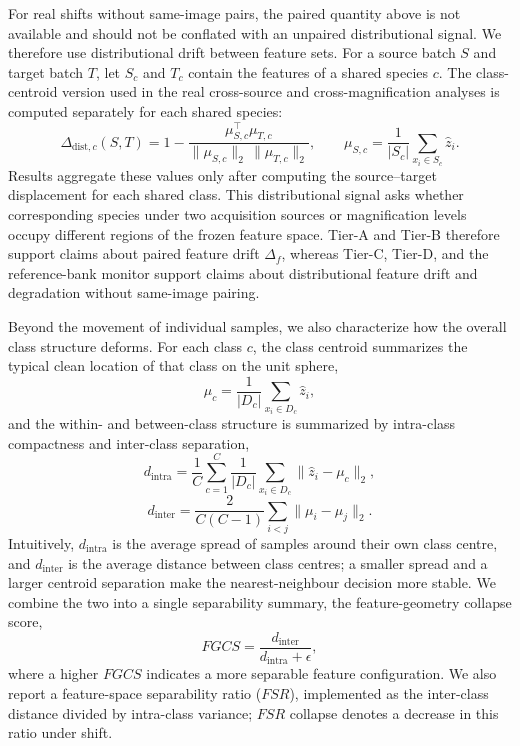 \documentclass[a4paper,fleqn]{els-cas-templates/cas-sc}
\begin{document}
For real shifts without same-image pairs, the paired quantity above is not
available and should not be conflated with an unpaired distributional signal. We therefore
use distributional drift between feature sets. For a source batch $S$ and target
batch $T$, let $S_c$ and $T_c$ contain the features of a shared species $c$.
The class-centroid version used in the real cross-source and
cross-magnification analyses is computed separately for each shared species:
\begin{equation}
  \Delta_{\mathrm{dist},c}(S,T)
  =1-\frac{\mu_{S,c}^\top \mu_{T,c}}
  {\|\mu_{S,c}\|_2\,\|\mu_{T,c}\|_2},
  \qquad
  \mu_{S,c}=\frac{1}{|S_c|}\sum_{x_i\in S_c} \hat z_i .
\end{equation}
Results aggregate these values only after computing the source--target
displacement for each shared class. This distributional signal asks whether
corresponding species under two acquisition sources or magnification levels
occupy different regions of the frozen feature space. Tier-A and Tier-B
therefore support claims about paired feature drift $\Delta_f$, whereas Tier-C,
Tier-D, and the reference-bank monitor support claims about distributional
feature drift and degradation without same-image pairing.

Beyond the movement of individual samples, we also characterize how the overall
class structure deforms. For each class $c$, the class centroid summarizes the
typical clean location of that class on the unit sphere,
\begin{equation}
  \mu_c=\frac{1}{|D_c|}\sum_{x_i\in D_c}\hat{z}_i ,
\end{equation}
and the within- and between-class structure is summarized by intra-class
compactness and inter-class separation,
\begin{equation}
  d_{\mathrm{intra}}=
  \frac{1}{C}\sum_{c=1}^{C}\frac{1}{|D_c|}
  \sum_{x_i\in D_c}\|\hat{z}_i-\mu_c\|_2 ,
\end{equation}
\begin{equation}
  d_{\mathrm{inter}}=
  \frac{2}{C(C-1)}\sum_{i<j}\|\mu_i-\mu_j\|_2 .
\end{equation}
Intuitively, $d_{\mathrm{intra}}$ is the average spread of samples around their
own class centre, and $d_{\mathrm{inter}}$ is the average distance between class
centres; a smaller spread and a larger centroid separation make the
nearest-neighbour decision more stable. We combine the two into a single
separability summary, the feature-geometry collapse score,
\begin{equation}
  FGCS=\frac{d_{\mathrm{inter}}}{d_{\mathrm{intra}}+\epsilon},
\end{equation}
where a higher $FGCS$ indicates a more separable feature configuration.
We also report a feature-space separability ratio ($FSR$), implemented as the
inter-class distance divided by intra-class variance; $FSR$ collapse denotes a
decrease in this ratio under shift.
\end{document}
